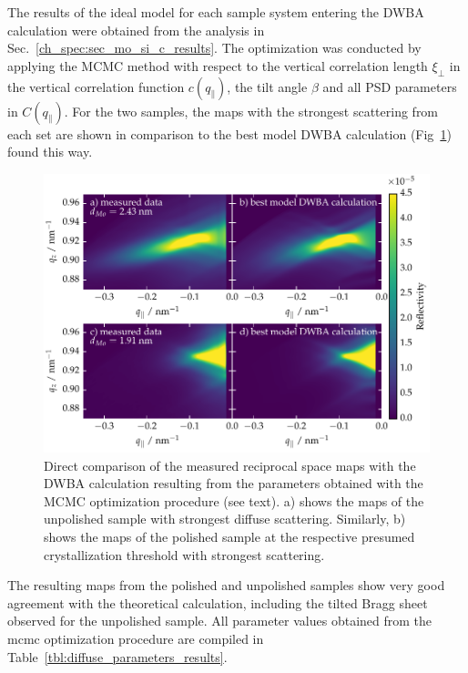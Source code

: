 The results of the ideal model for each sample system entering the DWBA calculation were obtained from the analysis in Sec.~\ref{ch_spec:sec_mo_si_c_results}. The optimization was conducted by applying the MCMC method with respect to the vertical correlation length $\xi_\perp$ in the vertical correlation function $c(q_\parallel)$, the tilt angle $\beta$ and all PSD parameters in $C(q_\parallel)$. For the two samples, the maps with the strongest scattering from each set are shown in comparison to the best model DWBA calculation (Fig~\ref{fig:dwba_data_best_model_comparison}) found this way. 
\begin{figure}[htbp]
\centering
\includegraphics[width=\textwidth]{img/MoSiC_dwba_data_best_model_comparison}
\caption{Direct comparison of the measured reciprocal space maps with the DWBA calculation resulting from the parameters obtained with the MCMC optimization procedure (see text). a) shows the maps of the unpolished sample with strongest diffuse scattering. Similarly, b) shows the maps of the polished sample at the respective presumed crystallization threshold with strongest scattering.}
\label{fig:dwba_data_best_model_comparison}
\end{figure}
The resulting maps from the polished and unpolished samples show very good agreement with the theoretical calculation, including the tilted Bragg sheet observed for the unpolished sample. All parameter values obtained from the \gls{mcmc} optimization procedure are compiled in Table~\ref{tbl:diffuse_parameters_results}. 
